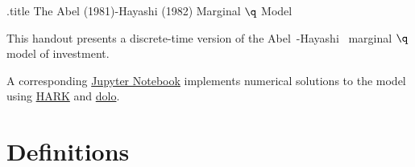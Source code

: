 \documentclass[headings=optiontotocandhead,toc=flat]{handout}
\begin{document}
\handoutHeader

\begin{verbatimwrite}{\jobname.title}
  The Abel (1981)-Hayashi (1982) Marginal $\q$ Model
\end{verbatimwrite}


\handoutNameMake

\renewcommand{\cite}{\citeyearpar}

This handout presents a discrete-time version of the Abel~\cite{abel:q}-Hayashi~\cite{hayashi:q} marginal $\q$ model of investment.

\newcommand{\darkolo}{https://github.com/econ-ark/DARKolo/blob/master/chimeras/qModel}

\newcommand{\notebook}{qModel-Template-Handout-Figures.ipynb}

A corresponding \href{\darkolo/\notebook}{Jupyter Notebook} implements numerical solutions to the model using \href{https://github.com/econ-ark/HARK}{HARK} and \href{https://dolo.readthedocs.io/en/doc/}{dolo}.

\section[hypertarget={Definitions}]{Definitions}
\end{document}
